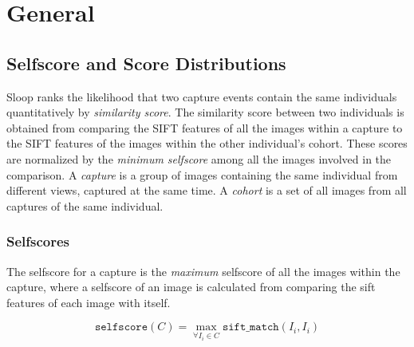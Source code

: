 \section{General}

\subsection{Selfscore and Score Distributions}

Sloop ranks the likelihood that two capture events contain the same individuals
quantitatively by \emph{similarity score}. The similarity score between two
individuals is obtained from comparing the SIFT features of all the images
within a capture to the SIFT features of the images within the other
individual's cohort.  These scores are normalized by the \emph{minimum
selfscore} among all the images involved in the comparison. A \emph{capture} is
a group of images containing the same individual from different views, captured
at the same time.  A \emph{cohort} is a set of all images from all captures of
the same individual.

\subsubsection{Selfscores}

The selfscore for a capture is the \emph{maximum} selfscore of all the images
within the capture, where a selfscore of an image is calculated from comparing
the sift features of each image with itself.

$$\texttt{selfscore}(C) = \max_{\forall I_i \in C} \texttt{sift\_match}(I_i, I_i)$$

